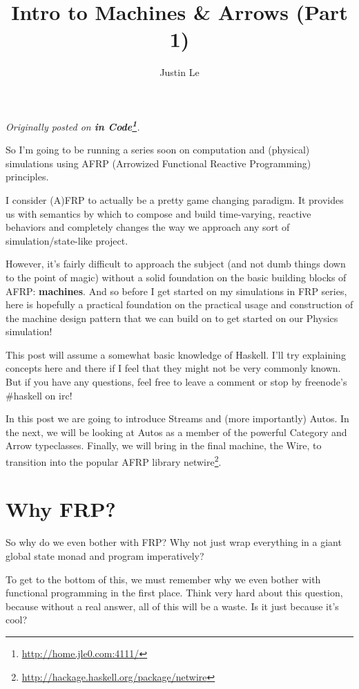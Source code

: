 \documentclass[]{article}
\title{Intro to Machines \& Arrows (Part 1)}
\author{Justin Le}
\renewcommand{\href}[2]{#2\footnote{\url{#1}}}
\begin{document}
\maketitle

\emph{Originally posted on \textbf{\href{http://home.jle0.com:4111/}{in
Code}}.}

So I'm going to be running a series soon on computation and (physical)
simulations using AFRP (Arrowized Functional Reactive Programming)
principles.

I consider (A)FRP to actually be a pretty game changing paradigm. It
provides us with semantics by which to compose and build time-varying,
reactive behaviors and completely changes the way we approach any sort
of simulation/state-like project.

However, it's fairly difficult to approach the subject (and not dumb
things down to the point of magic) without a solid foundation on the
basic building blocks of AFRP: \textbf{machines}. And so before I get
started on my simulations in FRP series, here is hopefully a practical
foundation on the practical usage and construction of the machine design
pattern that we can build on to get started on our Physics simulation!

This post will assume a somewhat basic knowledge of Haskell. I'll try
explaining concepts here and there if I feel that they might not be very
commonly known. But if you have any questions, feel free to leave a
comment or stop by freenode's \#haskell on irc!

In this post we are going to introduce Streams and (more importantly)
Autos. In the next, we will be looking at Autos as a member of the
powerful Category and Arrow typeclasses. Finally, we will bring in the
final machine, the Wire, to transition into the popular AFRP library
\href{http://hackage.haskell.org/package/netwire}{netwire}.

\section{Why FRP?}\label{why-frp}

So why do we even bother with FRP? Why not just wrap everything in a
giant global state monad and program imperatively?

To get to the bottom of this, we must remember why we even bother with
functional programming in the first place. Think very hard about this
question, because without a real answer, all of this will be a waste. Is
it just because it's cool?
\end{document}

